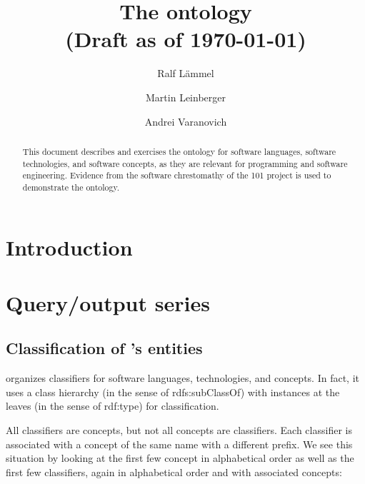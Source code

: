 \documentclass{llncs}
\title{The \solasote{} ontology\\
(Draft as of \today)}
\author{Ralf L\"ammel \and Martin Leinberger \and Andrei Varanovich}
\institute{Fachbereich Informatik, Universit\"at Koblenz-Landau, Germany}
\begin{document}
\maketitle

\begin{abstract}
  This document describes and exercises the \solasote{} ontology for
  software languages, software technologies, and software concepts, as
  they are relevant for programming and software engineering. Evidence
  from the software chrestomathy of the 101 project is used to
  demonstrate the ontology.
\end{abstract}


\section{Introduction}





\section{Query/output series}


\subsection{Classification of \solasote's entities}

\solasote{} organizes classifiers for software languages,
technologies, and concepts. In fact, it uses a class hierarchy (in the
sense of rdfs:subClassOf) with instances at the leaves (in the sense
of rdf:type) for classification.

All classifiers are concepts, but not all concepts are
classifiers. Each classifier is associated with a concept of the same
name with a different prefix. We see this situation by looking at the
first few concept in alphabetical order as well as the first few
classifiers, again in alphabetical order and with associated concepts: 



\end{document}
